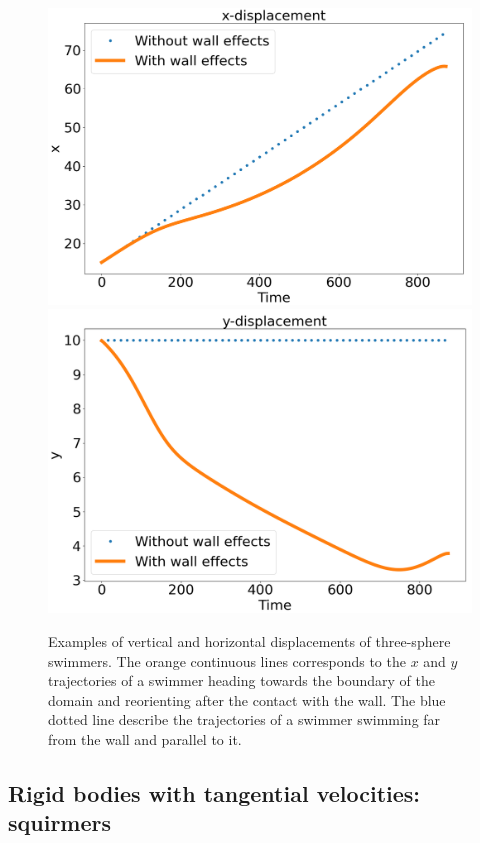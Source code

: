 \documentclass[graybox]{svmult}
\begin{document}
\begin{figure}[h!]
    \centering
    \includegraphics[scale=0.175]{Figures/three-sphere/Horizontal.png}
    \includegraphics[scale=0.175]{Figures/three-sphere/vertical.png}
    \caption{Examples of vertical and horizontal displacements of three-sphere swimmers. The orange continuous lines corresponds to the $x$ and $y$ trajectories of a swimmer heading towards the boundary of the domain and reorienting after the contact with the wall. The blue dotted line describe the trajectories of a swimmer swimming far from the wall and parallel to it.}
    \label{fig:3ss_2}
\end{figure}

\subsection{Rigid bodies with tangential velocities: squirmers}
\end{document}
